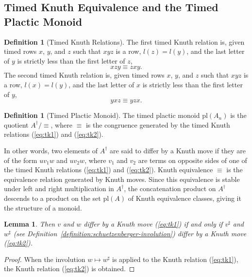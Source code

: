 \documentclass[10pt]{amsproc}
\newtheorem{lemma}[theorem]{Lemma}
\theoremstyle{definition}
\newtheorem{definition}[theorem]{Definition}
\theoremstyle{remark}
\newcommand{\pl}{\mathrm{pl}}
\begin{document}
\subsection{Timed Knuth Equivalence and the Timed Plactic Monoid}
\begin{definition}
  [Timed Knuth Relations]
  \label{sec:timed-knuth-equiv}
  The first timed Knuth relation is, given timed rows $x$, $y$, and $z$ such that $xyz$ is a row, $l(z)=l(y)$, and the last letter of $y$ is strictly less than the first letter of $z$,
  \begin{equation}
    \tag{$\kappa_1$}
    \label{eq:tk1}
    xzy \equiv zxy.
  \end{equation}
  The second timed Knuth relation is, given timed rows $x$, $y$, and $z$ such that $xyz$ is a row, $l(x)=l(y)$, and the last letter of $x$ is strictly less than the first letter of $y$,
  \begin{equation}
    \tag{$\kappa_2$}
    \label{eq:tk2}
    yxz \equiv yzx.
  \end{equation}
\end{definition}
\begin{definition}
  [Timed Plactic Monoid]
  \label{definition:timed-plactic-monoid}
  The timed plactic monoid $\pl(A_n)$ is the quotient $A^\dagger/\equiv$, where $\equiv$ is the congruence generated by the timed Knuth relations (\ref{eq:tk1}) and (\ref{eq:tk2}).
\end{definition}
In other words, two elements of $A^\dagger$ are said to differ by a Knuth move if they are of the form $uv_1w$ and $uv_2w$, where $v_1$ and $v_2$ are terms on opposite sides of one of the timed Knuth relations (\ref{eq:tk1}) and (\ref{eq:tk2}).
Knuth equivalence $\equiv$ is the equivalence relation generated by Knuth moves.
Since this equivalence is stable under left and right multiplication in $A^\dagger$, the concatenation product on $A^\dagger$ descends to a product on the set $\pl(A)$ of Knuth equivalence classes, giving it the structure of a monoid.
\begin{lemma}
  \label{lemma:sharp-moves}
  Then $v$ and $w$ differ by a Knuth move (\ref{eq:tk1}) if and only if $v^\sharp$ and $w^\sharp$ (see Definition~\ref{definition:schuetzenberger-involution}) differ by a Knuth move (\ref{eq:tk2}).
\end{lemma}
\begin{proof}
  When the involution $w\mapsto w^\sharp$ is applied to the Knuth relation (\ref{eq:tk1}), the Knuth relation (\ref{eq:tk2}) is obtained.
\end{proof}
\end{document}
